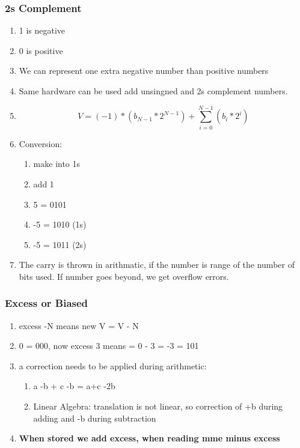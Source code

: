 \documentclass[11pt, a4paper]{article}
\begin{document}
\subsubsection{2s Complement}
\begin{enumerate}
    \item 1 is negative
    \item 0 is positive
    \item We can represent one extra negative number than positive numbers
    \item Same hardware can be used add unsingned and 2s complement numbers.
    \item
    \begin{equation}
        V = (-1)*({b_{N-1}}*2^{N-1})+\sum_{i=0}^{N-1}(b_{i}*2^{i})
    \end{equation}
    \item Conversion:
    \begin{enumerate}
        \item make into 1s
        \item add 1
        \item 5 = 0101
        \item -5 = 1010 (1s)
        \item -5 = 1011 (2s)
    \end{enumerate}
    \item The carry is thrown in arithmatic, if the number is range of the number of bits used. If number goes beyond, we get overflow errors.
\end{enumerate}
\subsubsection{Excess or Biased}
\begin{enumerate}
    \item excess -N means new V = V - N
    \item 0 = 000, now excess 3 means = 0 - 3 = -3 = 101
    \item a correction needs to be applied during arithmetic:
    \begin{enumerate}
        \item a -b + c -b = a+c -2b
        \item Linear Algebra: translation is not linear, so correction of +b during adding and -b during subtraction
    \end{enumerate}
    \item \textbf{When stored we add excess, when reading mme minus excess}
\end{enumerate}
\end{document}
